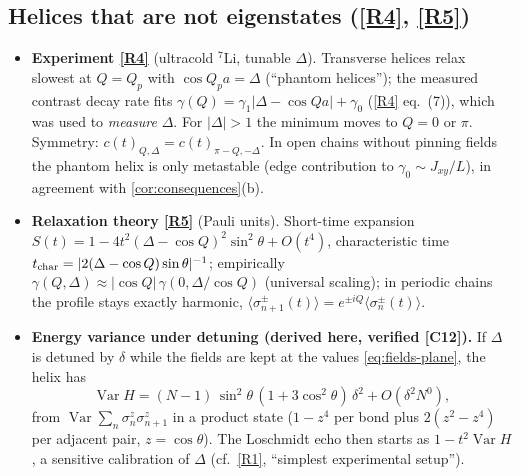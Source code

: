 \documentclass[11pt,a4paper]{article}
\theoremstyle{definition}
\newcommand{\ver}[1]{\textsf{[#1]}}   %
\begin{document}
\subsection{Helices that are not eigenstates (\ref{R4}, \ref{R5})}
\begin{itemize}
\item \textbf{Experiment \ref{R4}} (ultracold $^7$Li, tunable $\Delta$). Transverse helices relax slowest at $Q=Q_p$ with $\cos Q_pa=\Delta$ (``phantom helices''); the measured contrast decay rate fits $\gamma(Q)=\gamma_1|\Delta-\cos Qa|+\gamma_0$ (\ref{R4} eq.~(7)), which was used to \emph{measure} $\Delta$. For $|\Delta|>1$ the minimum moves to $Q=0$ or $\pi$. Symmetry: $c(t)_{Q,\Delta}=c(t)_{\pi-Q,-\Delta}$. In open chains without pinning fields the phantom helix is only metastable (edge contribution to $\gamma_0\sim J_{xy}/L$), in agreement with \cref{cor:consequences}(b).
\item \textbf{Relaxation theory \ref{R5}} (Pauli units). Short-time expansion $S(t)=1-4t^2(\Delta-\cos Q)^2\sin^2\theta+O(t^4)$, characteristic time $t_{\rm char}=|2(\Delta-\cos Q)\sin\theta|^{-1}$; empirically $\gamma(Q,\Delta)\approx|\cos Q|\,\gamma(0,\Delta/\cos Q)$ (universal scaling); in periodic chains the profile stays exactly harmonic, $\langle\sigma^\pm_{n+1}(t)\rangle=e^{\pm iQ}\langle\sigma^\pm_n(t)\rangle$.
\item \textbf{Energy variance under detuning (derived here, verified \ver{C12}).} If $\Delta$ is detuned by $\delta$ while the fields are kept at the values \eqref{eq:fields-plane}, the helix has
\begin{equation}\label{eq:variance}
\operatorname{Var}H=(N-1)\,\sin^2\theta\,(1+3\cos^2\theta)\,\delta^2+O(\delta^2 N^0),
\end{equation}
from $\operatorname{Var}\sum_n\sigma^z_n\sigma^z_{n+1}$ in a product state ($1-z^4$ per bond plus $2(z^2-z^4)$ per adjacent pair, $z=\cos\theta$). The Loschmidt echo then starts as $1-t^2\operatorname{Var}H$, a sensitive calibration of $\Delta$ (cf.\ \ref{R1}, ``simplest experimental setup'').
\end{itemize}
\end{document}
